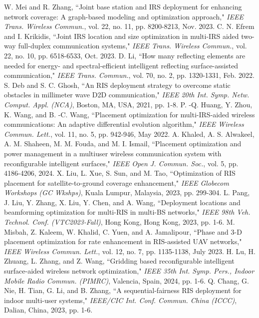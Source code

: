\documentclass{IEEEoj}
\begin{document}
\begin{thebibliography}{00}
	 W. Mei and R. Zhang, “Joint base station and IRS deployment for enhancing network coverage: A graph-based modeling and optimization approach," \textit{IEEE Trans. Wireless Commun.}, vol. 22, no. 11, pp. 8200-8213, Nov. 2023.
	 C. N. Efrem and I. Krikidis, “Joint IRS location and size optimization in multi-IRS aided two-way full-duplex communication systems," \textit{IEEE Trans. Wireless Commun.}, vol. 22, no. 10, pp. 6518-6533, Oct. 2023.
	 D. Li, “How many reflecting elements are needed for energy- and spectral-efficient intelligent reflecting surface-assisted communication," \textit{IEEE Trans. Commun.}, vol. 70, no. 2, pp. 1320-1331, Feb. 2022.
	 S. Deb and S. C. Ghosh, “An RIS deployment strategy to overcome static obstacles in millimeter wave D2D communication," \textit{IEEE 20th Int. Symp. Netw. Comput. Appl. (NCA)}, Boston, MA, USA, 2021, pp. 1-8.
	 P. -Q. Huang, Y. Zhou, K. Wang, and B. -C. Wang, “Placement optimization for multi-IRS-aided wireless communications: An adaptive differential evolution algorithm," \textit{IEEE Wireless Commun. Lett.}, vol. 11, no. 5, pp. 942-946, May 2022.
	 A. Khaled, A. S. Alwakeel, A. M. Shaheen, M. M. Fouda, and M. I. Ismail, “Placement optimization and power management in a multiuser wireless communication system with reconfigurable intelligent surfaces," \textit{IEEE Open J. Commun. Soc.}, vol. 5, pp. 4186-4206, 2024.
	 X. Liu, L. Xue, S. Sun, and M. Tao, “Optimization of RIS placement for satellite-to-ground coverage enhancement," \textit{IEEE Globecom Workshops (GC Wkshps)}, Kuala Lumpur, Malaysia, 2023, pp. 299-304.
	 L. Pang, J. Liu, Y. Zhang, X. Liu, Y. Chen, and A. Wang, “Deployment locations and beamforming optimization for multi-RIS in multi-BS networks," \textit{IEEE 98th Veh. Technol. Conf. (VTC2023-Fall)}, Hong Kong, Hong Kong, 2023, pp. 1-6.
	 M. Misbah, Z. Kaleem, W. Khalid, C. Yuen, and A. Jamalipour, “Phase and 3-D placement optimization for rate enhancement in RIS-assisted UAV networks," \textit{IEEE Wireless Commun. Lett.}, vol. 12, no. 7, pp. 1135-1138, July 2023.
	 H. Lu, H. Zhuang, L. Zhang, and Z. Wang, “Gridding based reconfigurable intelligent surface-aided wireless network optimization," \textit{IEEE 35th Int. Symp. Pers., Indoor Mobile Radio Commun. (PIMRC)}, Valencia, Spain, 2024, pp. 1-6.
	 Q. Chang, G. Nie, H. Tian, G. Li, and B. Zhang, “A sequential-fairness RIS deployment for indoor multi-user systems," \textit{IEEE/CIC Int. Conf. Commun. China (ICCC)}, Dalian, China, 2023, pp. 1-6.

\end{thebibliography}
\end{document}
